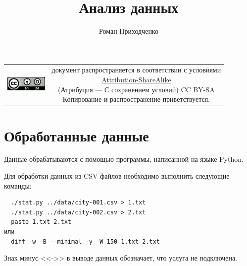 \documentclass[unicode, 12pt, a4paper,oneside,fleqn]{article}
\author{Роман Приходченко}
\title{Анализ данных}
\begin{document}
\renewcommand\bibname{СПИСОК ЛИТЕРАТУРЫ}
\renewcommand\refname{\centering Список литературы}
\renewcommand\contentsname{\centering Содержание}



\makeatletter %
\maketitle

\begin{table}[ht]
  \begin{tabular}{cc}
    \includegraphics[width=2cm]{../CC_BY-SA_88x31.png} &
    \shortstack{документ распространяется в соответствии с
      условиями\\
      \href{http://creativecommons.org/licenses/by-sa/3.0/}{Attribution-ShareAlike} \\
      (Атрибуция — С сохранением условий) CC BY-SA \\
      Копирование и распространение приветствуется.}
  \end{tabular}
\end{table}

\newpage
\tableofcontents

\newpage

\section{Обработанные данные}
Данные обрабатываются с помощью программы, написанной на языке Python.

Для обработки данных из CSV файлов необходимо выполнить следующие
команды:
\begin{Verbatim}
  ./stat.py ../data/city-001.csv > 1.txt
  ./stat.py ../data/city-002.csv > 2.txt
  paste 1.txt 2.txt
или
  diff -w -B --minimal -y -W 150 1.txt 2.txt
\end{Verbatim}
Знак минус <<->> в выводе данных обозначает, что услуга не подключена.
\end{document}
